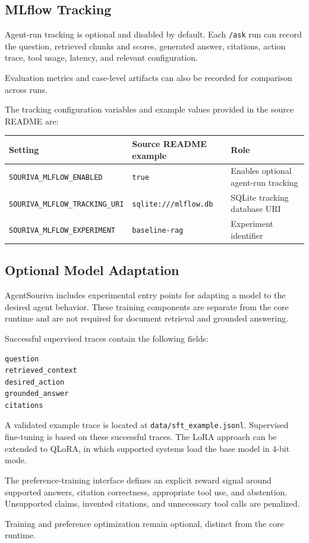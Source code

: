 \subsection{MLflow Tracking}

Agent-run tracking is optional and disabled by default. Each \texttt{/ask} run can record the question, retrieved chunks and scores, generated answer, citations, action trace, tool usage, latency, and relevant configuration.

Evaluation metrics and case-level artifacts can also be recorded for comparison across runs.

The tracking configuration variables and example values provided in the source README are:

\begingroup
\small
\setlength{\tabcolsep}{3pt}
\begin{longtable}[]{@{}p{2.25in}p{1.55in}p{2.30in}@{}}
\toprule\noalign{}
Setting & Source README example & Role \\
\midrule\noalign{}
\endhead
\bottomrule\noalign{}
\endlastfoot
\texttt{SOURIVA\_MLFLOW\_ENABLED} & \texttt{true} & Enables optional agent-run tracking \\
\texttt{SOURIVA\_MLFLOW\_TRACKING\_URI} & \texttt{sqlite:///mlflow.db} & SQLite tracking database URI \\
\texttt{SOURIVA\_MLFLOW\_EXPERIMENT} & \texttt{baseline-rag} & Experiment identifier \\
\end{longtable}
\endgroup

\subsection{Optional Model Adaptation}

AgentSouriva includes experimental entry points for adapting a model to the desired agent behavior. These training components are separate from the core runtime and are not required for document retrieval and grounded answering.

Successful supervised traces contain the following fields:

\begin{verbatim}
question
retrieved_context
desired_action
grounded_answer
citations
\end{verbatim}

A validated example trace is located at \texttt{data/sft\_example.jsonl}. Supervised fine-tuning is based on these successful traces. The LoRA approach can be extended to QLoRA, in which supported systems load the base model in 4-bit mode.

The preference-training interface defines an explicit reward signal around supported answers, citation correctness, appropriate tool use, and abstention. Unsupported claims, invented citations, and unnecessary tool calls are penalized.

Training and preference optimization remain optional, distinct from the core runtime.

